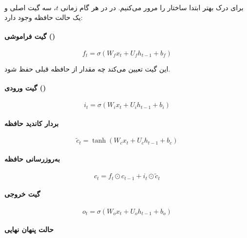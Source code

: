 \documentclass{article}
\begin{document}
برای درک بهتر  ابتدا ساختار  را مرور می‌کنیم. 
در  در هر گام زمانی \( t \)، سه گیت اصلی و یک حالت حافظه وجود دارد:

\paragraph{گیت فراموشی ()}

\begin{equation}
	f_t = \sigma(W_f x_t + U_f h_{t-1} + b_f)
\end{equation}

این گیت تعیین می‌کند چه مقدار از حافظه قبلی حفظ شود.

\paragraph{گیت ورودی ()}

\begin{equation}
	i_t = \sigma(W_i x_t + U_i h_{t-1} + b_i)
\end{equation}

\paragraph{بردار کاندید حافظه}

\begin{equation}
	\tilde{c}_t = \tanh(W_c x_t + U_c h_{t-1} + b_c)
\end{equation}

\paragraph{به‌روزرسانی حافظه}

\begin{equation}
	c_t = f_t \odot c_{t-1} + i_t \odot \tilde{c}_t
\end{equation}

\paragraph{گیت خروجی}

\begin{equation}
	o_t = \sigma(W_o x_t + U_o h_{t-1} + b_o)
\end{equation}

\paragraph{حالت پنهان نهایی}
\end{document}
